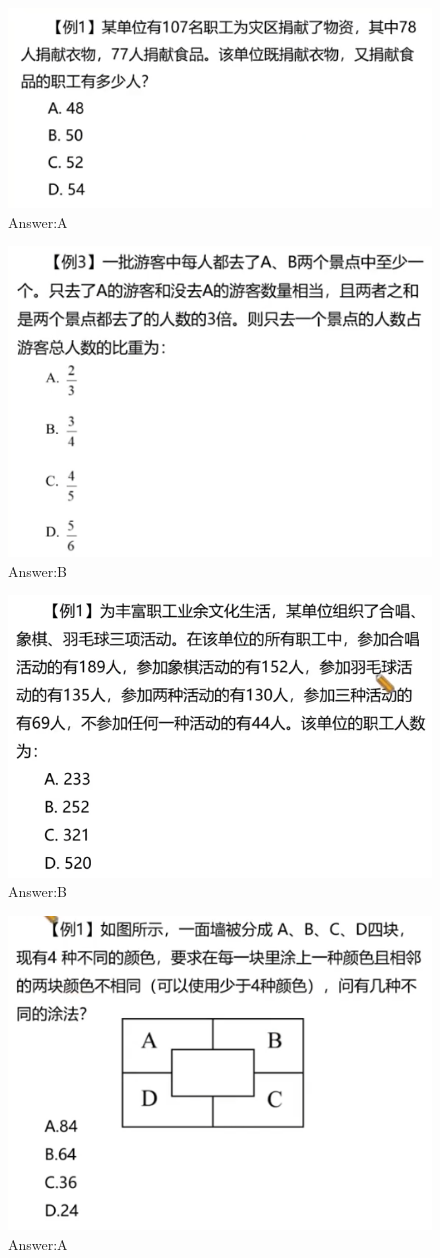 \documentclass{article}
\numberwithin{equation}{section}						%
\numberwithin{figure}{section}							%
\begin{document}
\begin{sloppypar}
\begin{figure}[H]
     \centering
     \includegraphics[width=0.6\linewidth]{286.png}
		\caption{Answer:A}
\end{figure}

\begin{figure}[H]
     \centering
     \includegraphics[width=0.6\linewidth]{287.png}
		\caption{Answer:B}
\end{figure}


\begin{figure}[H]
     \centering
     \includegraphics[width=0.6\linewidth]{288.png}
		\caption{Answer:B}
\end{figure}

\begin{figure}[H]
     \centering
     \includegraphics[width=0.6\linewidth]{289.png}
		\caption{Answer:A}
\end{figure}


\end{sloppypar}
\end{document}
